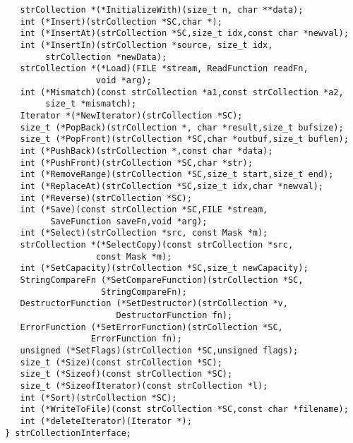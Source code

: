 \begin{verbatim}
   strCollection *(*InitializeWith)(size_t n, char **data);
   int (*Insert)(strCollection *SC,char *);
   int (*InsertAt)(strCollection *SC,size_t idx,const char *newval);
   int (*InsertIn)(strCollection *source, size_t idx,
        strCollection *newData);
   strCollection *(*Load)(FILE *stream, ReadFunction readFn,
                  void *arg);
   int (*Mismatch)(const strCollection *a1,const strCollection *a2,
        size_t *mismatch);
   Iterator *(*NewIterator)(strCollection *SC);
   size_t (*PopBack)(strCollection *, char *result,size_t bufsize);
   size_t (*PopFront)(strCollection *SC,char *outbuf,size_t buflen);
   int (*PushBack)(strCollection *,const char *data);
   int (*PushFront)(strCollection *SC,char *str);
   int (*RemoveRange)(strCollection *SC,size_t start,size_t end);
   int (*ReplaceAt)(strCollection *SC,size_t idx,char *newval);
   int (*Reverse)(strCollection *SC);
   int (*Save)(const strCollection *SC,FILE *stream,
         SaveFunction saveFn,void *arg);
   int (*Select)(strCollection *src, const Mask *m);
   strCollection *(*SelectCopy)(const strCollection *src,
                  const Mask *m);
   int (*SetCapacity)(strCollection *SC,size_t newCapacity);
   StringCompareFn (*SetCompareFunction)(strCollection *SC,
                   StringCompareFn);
   DestructorFunction (*SetDestructor)(strCollection *v,
                      DestructorFunction fn);
   ErrorFunction (*SetErrorFunction)(strCollection *SC,
                 ErrorFunction fn);
   unsigned (*SetFlags)(strCollection *SC,unsigned flags);
   size_t (*Size)(const strCollection *SC);
   size_t (*Sizeof)(const strCollection *SC);
   size_t (*SizeofIterator)(const strCollection *l);
   int (*Sort)(strCollection *SC);
   int (*WriteToFile)(const strCollection *SC,const char *filename);
   int (*deleteIterator)(Iterator *);
} strCollectionInterface;
\end{verbatim}
